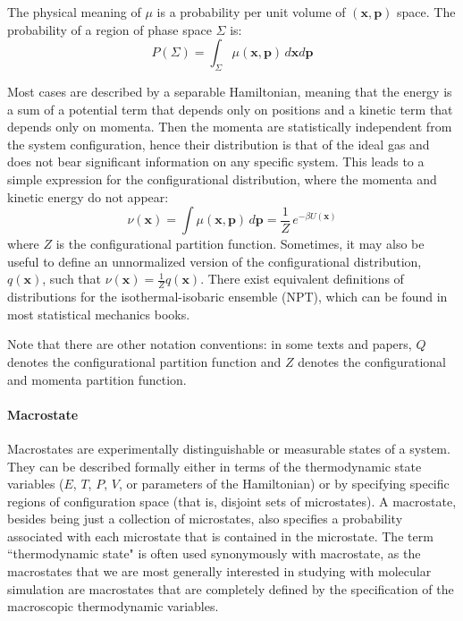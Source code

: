 \documentclass[9pt,review]{livecoms}
\newcommand{\vx}{\mathbf{x}}
\newcommand{\vp}{\mathbf{p}}
\begin{document}
The physical meaning of $\mu$ is a probability per unit volume of $(\vx, \vp)$ space. The probability of a region of phase space $\Sigma$ is:
\begin{equation}
    P(\Sigma) = \int_\Sigma \mu(\vx, \vp) \, d\vx d\vp
\end{equation}

Most cases are described by a separable Hamiltonian, meaning that the energy is a sum of a potential term that depends only on positions and a kinetic term that depends only on momenta.
Then the momenta are statistically independent from the system configuration, hence their distribution is that of the ideal gas and does not bear significant information on any specific system.
This leads to a simple expression for the configurational distribution, where the momenta and kinetic energy do not appear:
\begin{equation}
\nu(\vx) = \int \mu(\vx, \vp) \, d\vp = \frac{1}{Z} \, e^{-\beta U(\vx)}
\end{equation}
where $Z$ is the configurational partition function. Sometimes, it may also be useful to define an unnormalized version of the configurational distribution, $q(\vx)$, such that $\nu(\vx) = \frac{1}{Z}q(\vx)$. There exist equivalent definitions of distributions for the isothermal-isobaric ensemble (NPT), which can be found in most statistical mechanics books.\cite{Zuckerman2010, Tuckerman2010}

Note that there are other notation conventions: in some texts and papers, $Q$ denotes the configurational partition function and $Z$ denotes the configurational and momenta partition function.


\paragraph{Macrostate}

Macrostates are experimentally distinguishable or measurable states of a system.
They can be described formally either in terms of the thermodynamic state variables ($E$, $T$, $P$, $V$, or parameters of the Hamiltonian) or by specifying specific regions of configuration space (that is, disjoint sets of microstates). A macrostate, besides being just a collection of microstates, also specifies a probability associated with each microstate that is contained in the microstate. The term ``thermodynamic state" is often used synonymously with macrostate, as the macrostates that we are most generally interested in studying with molecular simulation are macrostates that are completely defined by the specification of the macroscopic thermodynamic variables.
\end{document}
